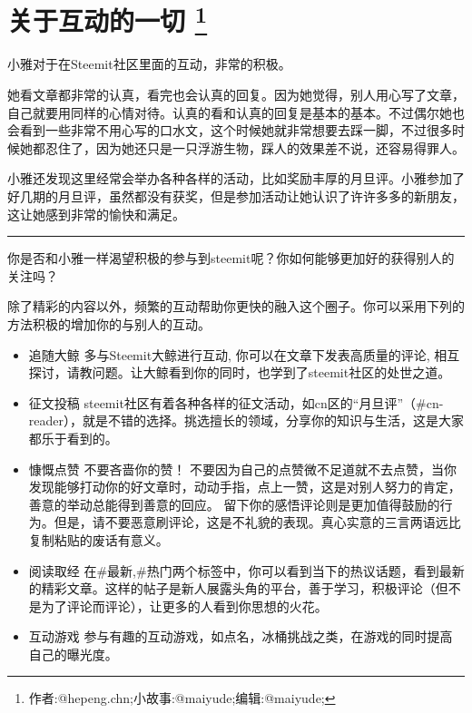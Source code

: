 \documentclass[]{ctexbook}
\begin{document}
\section[关于互动的一切 ]{\texorpdfstring{关于互动的一切 \footnote{作者:@hepeng.chn;小故事:@maiyude;编辑:@maiyude;}}{关于互动的一切 }}

小雅对于在Steemit社区里面的互动，非常的积极。

她看文章都非常的认真，看完也会认真的回复。因为她觉得，别人用心写了文章，自己就要用同样的心情对待。认真的看和认真的回复是基本的基本。不过偶尔她也会看到一些非常不用心写的口水文，这个时候她就非常想要去踩一脚，不过很多时候她都忍住了，因为她还只是一只浮游生物，踩人的效果差不说，还容易得罪人。

小雅还发现这里经常会举办各种各样的活动，比如奖励丰厚的月旦评。小雅参加了好几期的月旦评，虽然都没有获奖，但是参加活动让她认识了许许多多的新朋友，这让她感到非常的愉快和满足。

\begin{center}\rule{0.5\linewidth}{\linethickness}\end{center}

你是否和小雅一样渴望积极的参与到steemit呢？你如何能够更加好的获得别人的关注吗？

除了精彩的内容以外，频繁的互动帮助你更快的融入这个圈子。你可以采用下列的方法积极的增加你的与别人的互动。

\begin{itemize}
\item
  追随大鲸
  多与Steemit大鲸进行互动, 你可以在文章下发表高质量的评论, 相互探讨，请教问题。让大鲸看到你的同时，也学到了steemit社区的处世之道。
\item
  征文投稿
  steemit社区有着各种各样的征文活动，如cn区的``月旦评''（\#cn-reader），就是不错的选择。挑选擅长的领域，分享你的知识与生活，这是大家都乐于看到的。
\item
  慷慨点赞
  不要吝啬你的赞！
  不要因为自己的点赞微不足道就不去点赞，当你发现能够打动你的好文章时，动动手指，点上一赞，这是对别人努力的肯定，善意的举动总能得到善意的回应。
  留下你的感悟评论则是更加值得鼓励的行为。但是，请不要恶意刷评论，这是不礼貌的表现。真心实意的三言两语远比复制粘贴的废话有意义。
\item
  阅读取经
  在\#最新,\#热门两个标签中，你可以看到当下的热议话题，看到最新的精彩文章。这样的帖子是新人展露头角的平台，善于学习，积极评论（但不是为了评论而评论），让更多的人看到你思想的火花。
\item
  互动游戏
  参与有趣的互动游戏，如点名，冰桶挑战之类，在游戏的同时提高自己的曝光度。
\end{itemize}
\end{document}
